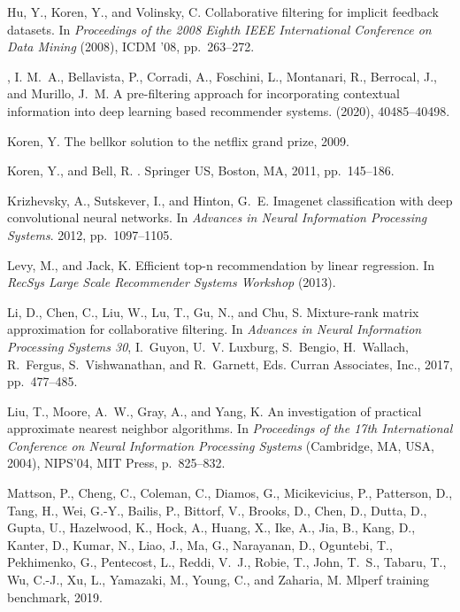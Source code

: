 \documentclass{article}
\begin{document}
\begin{thebibliography}{10}
{\sc Hu, Y., Koren, Y., and Volinsky, C.}
\newblock Collaborative filtering for implicit feedback datasets.
\newblock In {\em Proceedings of the 2008 Eighth IEEE International Conference
  on Data Mining\/} (2008), ICDM '08, pp.~263--272.

{, I. M.~A., {Bellavista}, P., {Corradi}, A., {Foschini}, L.,
  {Montanari}, R., {Berrocal}, J., and {Murillo}, J.~M.}
\newblock A pre-filtering approach for incorporating contextual information
  into deep learning based recommender systems.
 (2020), 40485--40498.

{\sc Koren, Y.}
\newblock The bellkor solution to the netflix grand prize, 2009.

{\sc Koren, Y., and Bell, R.}
.
\newblock Springer US, Boston, MA, 2011, pp.~145--186.

{\sc Krizhevsky, A., Sutskever, I., and Hinton, G.~E.}
\newblock Imagenet classification with deep convolutional neural networks.
\newblock In {\em Advances in Neural Information Processing Systems}. 2012,
  pp.~1097--1105.

{\sc Levy, M., and Jack, K.}
\newblock Efficient top-n recommendation by linear regression.
\newblock In {\em RecSys Large Scale Recommender Systems Workshop\/} (2013).

{\sc Li, D., Chen, C., Liu, W., Lu, T., Gu, N., and Chu, S.}
\newblock Mixture-rank matrix approximation for collaborative filtering.
\newblock In {\em Advances in Neural Information Processing Systems 30},
  I.~Guyon, U.~V. Luxburg, S.~Bengio, H.~Wallach, R.~Fergus, S.~Vishwanathan,
  and R.~Garnett, Eds. Curran Associates, Inc., 2017, pp.~477--485.

{\sc Liu, T., Moore, A.~W., Gray, A., and Yang, K.}
\newblock An investigation of practical approximate nearest neighbor
  algorithms.
\newblock In {\em Proceedings of the 17th International Conference on Neural
  Information Processing Systems\/} (Cambridge, MA, USA, 2004), NIPS’04, MIT
  Press, p.~825–832.

{\sc Mattson, P., Cheng, C., Coleman, C., Diamos, G., Micikevicius, P.,
  Patterson, D., Tang, H., Wei, G.-Y., Bailis, P., Bittorf, V., Brooks, D.,
  Chen, D., Dutta, D., Gupta, U., Hazelwood, K., Hock, A., Huang, X., Ike, A.,
  Jia, B., Kang, D., Kanter, D., Kumar, N., Liao, J., Ma, G., Narayanan, D.,
  Oguntebi, T., Pekhimenko, G., Pentecost, L., Reddi, V.~J., Robie, T., John,
  T.~S., Tabaru, T., Wu, C.-J., Xu, L., Yamazaki, M., Young, C., and Zaharia,
  M.}
\newblock Mlperf training benchmark, 2019.


\end{thebibliography}
\end{document}
